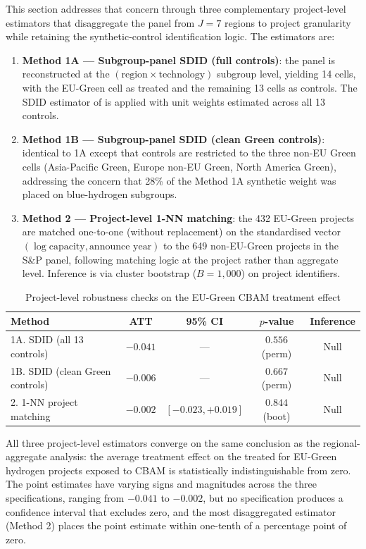 This section addresses that concern through three complementary project-level estimators that disaggregate the panel from $J = 7$ regions to project granularity while retaining the synthetic-control identification logic. The estimators are:
\begin{enumerate}
\item \textbf{Method 1A --- Subgroup-panel SDID (full controls)}: the panel is reconstructed at the $(\text{region} \times \text{technology})$ subgroup level, yielding 14 cells, with the EU-Green cell as treated and the remaining 13 cells as controls. The SDID estimator of \cite{arkhangelsky2021synthetic} is applied with unit weights estimated across all 13 controls.
\item \textbf{Method 1B --- Subgroup-panel SDID (clean Green controls)}: identical to 1A except that controls are restricted to the three non-EU Green cells (Asia-Pacific Green, Europe non-EU Green, North America Green), addressing the concern that 28\% of the Method 1A synthetic weight was placed on blue-hydrogen subgroups.
\item \textbf{Method 2 --- Project-level 1-NN matching}: the 432 EU-Green projects are matched one-to-one (without replacement) on the standardised vector $(\log \text{capacity}, \text{announce year})$ to the 649 non-EU-Green projects in the S\&P panel, following \cite{abadie2010synthetic} matching logic at the project rather than aggregate level. Inference is via cluster bootstrap ($B = 1{,}000$) on project identifiers.
\end{enumerate}

\begin{table}[!htbp]
\centering
\caption{Project-level robustness checks on the EU-Green CBAM treatment effect}
\label{tab:ch8-project-sdid}
\begin{tabular}{lcccc}
\toprule
Method & ATT & 95\% CI & $p$-value & Inference \\
\midrule
1A. SDID (all 13 controls) & $-0.041$ & --- & $0.556$ (perm) & Null \\
1B. SDID (clean Green controls) & $-0.006$ & --- & $0.667$ (perm) & Null \\
2. 1-NN project matching & $-0.002$ & $[-0.023, +0.019]$ & $0.844$ (boot) & Null \\
\bottomrule
\end{tabular}
\end{table}

All three project-level estimators converge on the same conclusion as the regional-aggregate analysis: the average treatment effect on the treated for EU-Green hydrogen projects exposed to CBAM is statistically indistinguishable from zero. The point estimates have varying signs and magnitudes across the three specifications, ranging from $-0.041$ to $-0.002$, but no specification produces a confidence interval that excludes zero, and the most disaggregated estimator (Method 2) places the point estimate within one-tenth of a percentage point of zero.


